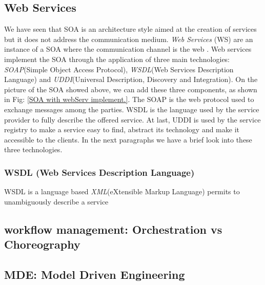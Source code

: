 \subsection{Web Services}
\label{WebServices}
We have seen that SOA is an architecture style aimed at the creation of services but it does not address the communication medium. \textit{Web Services} (WS) are an instance of a SOA where the communication channel is the web \cite{Pernici04}.
Web services implement the SOA through the application of three main technologies: \textit{SOAP}(Simple Object Access Protocol), \textit{WSDL}(Web Services Description Language) and \textit{UDDI}(Universal Description, Discovery and Integration).
On the picture of the SOA showed above, we can add these three components, as shown in Fig: \ref{SOA with webServ implement.}. The SOAP is the web protocol used to exchange messages among the parties. WSDL is the language used by the service provider to fully describe the offered service. At last, UDDI is used by the service registry to make a service easy to find, abstract its technology and make it accessible to the clients.
In the next paragraphs we have a brief look into these three technologies.

\subsubsection{WSDL (Web Services Description Language) }
WSDL is a language based \textit{XML}(eXtensible Markup Language) permits to unambiguously describe a service
% 

\subsection{workflow management: Orchestration vs Choreography}

\subsection{MDE: Model Driven Engineering}
 


